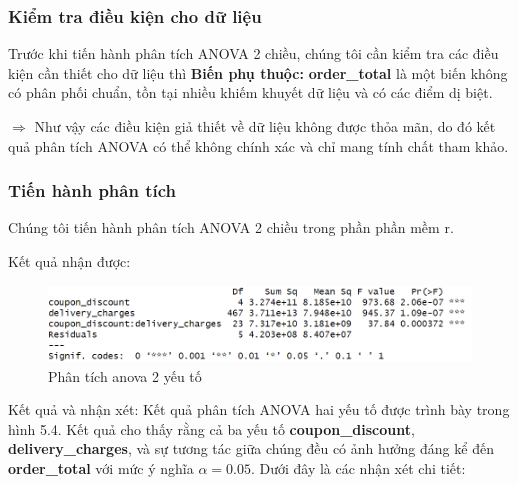 \subsubsection{Kiểm tra điều kiện cho dữ liệu}
Trước khi tiến hành phân tích ANOVA 2 chiều, chúng tôi cần kiểm tra các điều kiện cần thiết cho dữ liệu thì \textbf{Biến phụ thuộc:} \textbf{order\_total} là một biến không có phân phối chuẩn, tồn tại nhiều khiếm khuyết dữ liệu và có các điểm dị biệt.

$ \Rightarrow $ Như vậy các điều kiện giả thiết về dữ liệu không được thỏa mãn, do đó kết quả phân tích ANOVA có thể không chính xác và chỉ mang tính chất tham khảo.
\subsubsection{Tiến hành phân tích}
Chúng tôi tiến hành phân tích ANOVA 2 chiều trong phần phần mềm r. 

         Kết quả nhận được: 
        
        \begin{figure}[!htbp]
            \centering
            \includegraphics[width=1\linewidth]{graphics/5.4.3.png}
            \caption{Phân tích anova 2 yếu tố}
        \end{figure}
        
        
        Kết quả và nhận xét: 
        Kết quả phân tích ANOVA hai yếu tố được trình bày trong hình 5.4. Kết quả cho thấy rằng cả ba yếu tố \textbf{coupon\_discount}, \textbf{delivery\_charges}, và sự tương tác giữa chúng đều có ảnh hưởng đáng kể đến \textbf{order\_total} với mức ý nghĩa $\alpha = 0.05$. Dưới đây là các nhận xét chi tiết:
        
